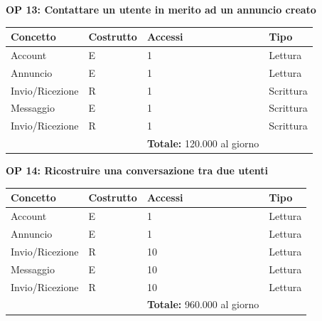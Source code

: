 \documentclass[a4paper,12pt]{report}
\begin{document}
            \textbf{OP 13: Contattare un utente in merito ad un annuncio creato}
        	\begin{table}[H]
            \centering
             \begin{tabular}{llll}
             \rowcolor{yellow!20} \textbf{Concetto} & \textbf{Costrutto} & \textbf{Accessi} & \textbf{Tipo}\\ [0.5ex] 
             \hline
             Account & E & 1 & Lettura \\ 
             Annuncio & E & 1 & Lettura \\ 
             Invio/Ricezione & R & 1 & Scrittura \\ 
             Messaggio & E & 1 & Scrittura \\ 
             Invio/Ricezione & R & 1 & Scrittura \\ 
             \hline
                \rowcolor{yellow!20} &   & \textbf{Totale:}  120.000 al giorno &  \\ [1ex] 
             
             \end{tabular}
            \end{table}

            \textbf{OP 14: Ricostruire una conversazione tra due utenti}
        	\begin{table}[H]
            \centering
             \begin{tabular}{llll}
             \rowcolor{yellow!20} \textbf{Concetto} & \textbf{Costrutto} & \textbf{Accessi} & \textbf{Tipo}\\ [0.5ex] 
             \hline
             Account & E & 1 & Lettura \\ 
             Annuncio & E & 1 & Lettura \\ 
             Invio/Ricezione & R & 10 & Lettura \\ 
             Messaggio & E & 10 & Lettura \\ 
             Invio/Ricezione & R & 10 & Lettura \\ 
             \hline
                \rowcolor{yellow!20} &   & \textbf{Totale:}  960.000 al giorno &  \\ [1ex] 
             
             \end{tabular}
            \end{table}
\end{document}
